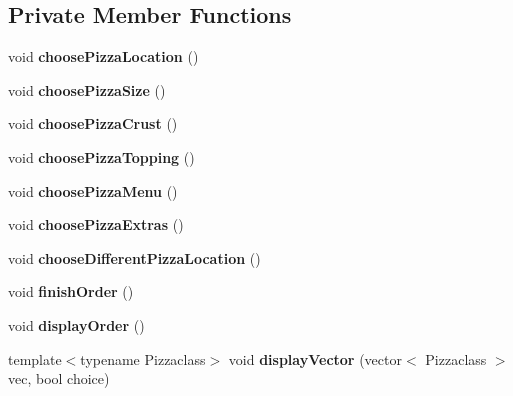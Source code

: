 \subsection*{Private Member Functions}
\begin{CompactItemize}
\item 
\hypertarget{class_sala_u_i_2ecb7f1a49b75b7e85658d1ab1a53768}{
void {\bf choose\-Pizza\-Location} ()}
\label{class_sala_u_i_2ecb7f1a49b75b7e85658d1ab1a53768}

\item 
\hypertarget{class_sala_u_i_f4474252328143961bb945b389c43c8e}{
void {\bf choose\-Pizza\-Size} ()}
\label{class_sala_u_i_f4474252328143961bb945b389c43c8e}

\item 
\hypertarget{class_sala_u_i_7e0e114bfc067eff3f1a719ae1d8a761}{
void {\bf choose\-Pizza\-Crust} ()}
\label{class_sala_u_i_7e0e114bfc067eff3f1a719ae1d8a761}

\item 
\hypertarget{class_sala_u_i_7a3b8c7404edc61551dd7fc45dc0a73c}{
void {\bf choose\-Pizza\-Topping} ()}
\label{class_sala_u_i_7a3b8c7404edc61551dd7fc45dc0a73c}

\item 
\hypertarget{class_sala_u_i_69e30f066d38ed44f20a2220dc6abc67}{
void {\bf choose\-Pizza\-Menu} ()}
\label{class_sala_u_i_69e30f066d38ed44f20a2220dc6abc67}

\item 
\hypertarget{class_sala_u_i_a90b1811636d87d0d07bb47ae09fb01e}{
void {\bf choose\-Pizza\-Extras} ()}
\label{class_sala_u_i_a90b1811636d87d0d07bb47ae09fb01e}

\item 
\hypertarget{class_sala_u_i_2497b9b9d2b3a2225129ac964dbcecd1}{
void {\bf choose\-Different\-Pizza\-Location} ()}
\label{class_sala_u_i_2497b9b9d2b3a2225129ac964dbcecd1}

\item 
\hypertarget{class_sala_u_i_a10e7d346b02f07f3ed74ec4883c1c07}{
void {\bf finish\-Order} ()}
\label{class_sala_u_i_a10e7d346b02f07f3ed74ec4883c1c07}

\item 
\hypertarget{class_sala_u_i_8e775db15a8cd6d81bacfe0f820a7f51}{
void {\bf display\-Order} ()}
\label{class_sala_u_i_8e775db15a8cd6d81bacfe0f820a7f51}

\item 
\hypertarget{class_sala_u_i_4ea2f17c1ceb659e1244e7d7330cdee5}{
template$<$typename Pizzaclass$>$ void {\bf display\-Vector} (vector$<$ Pizzaclass $>$ vec, bool choice)}
\label{class_sala_u_i_4ea2f17c1ceb659e1244e7d7330cdee5}

\end{CompactItemize}
